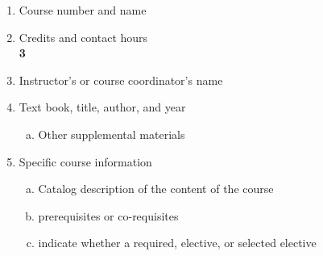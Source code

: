 \label{CourseCode}  %
\begin{enumerate}[1.]
\item Course number and name\\
  {\bfseries
    
  }
  
\item Credits and contact hours\\
  {\bfseries
    3  %
  }

\item Instructor's or course coordinator's name\\
  {\bfseries
    
  }

\item Text book, title, author, and year\\
  {\bfseries
    
  }
\begin{enumerate}[a.]
\item Other supplemental materials\\
  {\bfseries
    
  }
\end{enumerate}

\item Specific course information
\begin{enumerate}[a.]  
\item Catalog description of the content of the course\\
  {\bfseries
    
  }

\item prerequisites or co-requisites\\
  {\bfseries
  }

\item indicate whether a required, elective, or selected elective\\ %
  {\bfseries
  }


\end{enumerate}
\end{enumerate}
